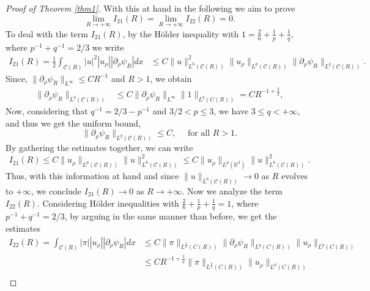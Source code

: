\documentclass[a4paper,12pt]{amsart}
\theoremstyle{definition}
\theoremstyle{plain}
\def\R{\mathbb{R}}
\def\R{\mathbb R}
\def\vu{ u }
\begin{document}
\begin{proof}[Proof of Theorem \ref{thm1}]
With this at hand in the following we aim to prove 
$$
\displaystyle \lim_{R\to +\infty}I_{21}(R)= \lim_{R\to +\infty} I_{22}(R)=0.
$$
To deal with the term $I_{21}(R)$, by the H\"older inequality with 
$ 
1=\frac{2}{6}+\frac{1}{p} +\frac{1}{q},
$ 
where $p^{-1}+q^{-1}=2/3$
we write 
\begin{align}\label{forheuristic1}
I_{21}(R)= \frac{1}{2}  
\int_{\mathcal{C}( R) }|\vu|^2
| \vu_\rho |
| \partial_\rho\psi_R |
 dx 
&\leq   C
\|\vu \|_{L^{ 6 }(\mathcal{C}( R)  )}^2
\|u_\rho \|_{L^{ p }(\mathcal{C}( R) )}
\|\partial_\rho \psi_R \|_{L^{ q }(\mathcal{C}( R) )}
. 
\end{align}
Since,   $ \| \partial_\rho \psi_R  \|_{L^{\infty}}\leq CR^{-1}$ and $R>1$,  we obtain  
\begin{align}
\| \partial_\rho \psi_R \|_{L^{q}(\mathcal{C}( R) )}
&
\leq 
C\|\partial_\rho \psi_R  \|_{L^{\infty}  }
\|1\|_{L^{ q }(C( R) )}
=
 C R^{-1+\frac 3{q}}  
 ,
\end{align}
Now, considering that $q^{-1}=2/3 - p^{-1}$ and $3/2<p\leq 3$, we have $3 \leq q <+\infty$, and thus we get the uniform bound,  
\begin{equation}
\| \partial_\rho \psi_R \|_{L^{q}(\mathcal{C}( R) )} \leq  C, \quad 
\text{ for all }R> 1.
\end{equation}
By gathering the estimates together, we can write
\begin{equation}%
I_{21}(R)\leq 
  C  
  \|u_\rho \|_{L^{ p }(\mathcal{C}( R) )}
\|\vu \|_{L^{6}( \mathcal{C}( R)  )}^2
\leq 
  C  
  \|u_\rho \|_{L^{ p }(\R^3 )}
\|\vu \|_{L^{6}( \mathcal{C}( R)  )}^2
. 
\end{equation}
Thus, with this information at hand and since $\|u\|_{L^{6}( \mathcal{C}( R)  )} \to 0$ as $R$ evolves to $+\infty$, we conclude $I_{21}(R) \to 0$ as ${R\to +\infty}$.
Now we analyze the term $I_{22}(R)$. Considering H\"older inequalities with $ \frac{2}{6}+\frac{1}{p } + \frac 1 q =1$, where $p^{-1}+q^{-1}=2/3$,  by arguing in the same manner than before, we  get the estimates 
\begin{align}\label{forheuristic2}
I_{22}(R)
= 
\int_{\mathcal{C}( R) } 
 |\pi |
 | \vu_\rho |
| \partial_\rho\psi_R |  
  dx 
&\leq 
C 
\|\pi \|_{L^{\frac{6}{2}}(C( R) )}
\|  \partial_\rho\psi_R \|_{L^{q }(C( R) )} 
\| \vu_\rho \|_{L^{p}( C ( R) )} 
\\
&\leq 
 C R^{-1+\frac 3{q }}
\|\pi \|_{L^{\frac{6 }{2}}( C( R) )}\| \vu_\rho \|_{L^{p}( C( R) )}
\\

\end{align}
\end{proof}
\end{document}
